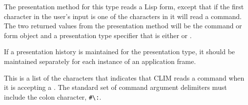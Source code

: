The  presentation method for this type reads a Lisp form, except that
if the first character in the user's input is one of the characters in
 it will read a command.  The two returned values from
the  presentation method will be the command or form object and a
presentation type specifier that is either  or .

If a presentation history is maintained for the 
presentation type, it should be maintained separately for each instance of an
application frame.


This is a list of the characters that indicates that CLIM reads a command when
it is accepting a .  The standard set of command argument
delimiters must include the colon character, \verb+#\:+.
